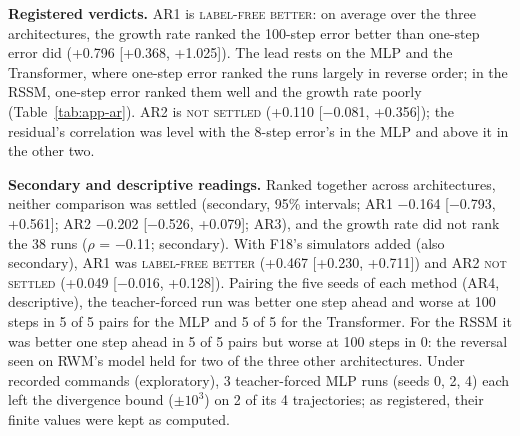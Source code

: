 \begin{table}[h]
\centering
\caption{Study AR: Spearman correlation $\rho$ of each check with the 100-step error $E_{100}$, recorded joint
commands, F18's held-out trajectories. Rows ``all runs'' and ``with F18'' (F18's 97 stored values added,
135 in all) rank every simulator together (secondary).}
\label{tab:app-ar}
\footnotesize
\setlength{\tabcolsep}{4pt}
\end{table}

\textbf{Registered verdicts.} AR1 is \textsc{label-free better}: on average over the three architectures, the growth
rate ranked the 100-step error better than one-step error did (+0.796 [+0.368, +1.025]). The lead rests on
the MLP and the Transformer, where one-step error ranked the runs largely in reverse order; in the RSSM, one-step error
ranked them well and the growth rate poorly (Table~\ref{tab:app-ar}). AR2 is \textsc{not settled}
(+0.110 [$-$0.081, +0.356]); the residual's correlation was level with the 8-step error's in the MLP and above it
in the other two.

\textbf{Secondary and descriptive readings.} Ranked together across architectures, neither comparison was settled
(secondary, 95\% intervals; AR1 $-$0.164 [$-$0.793, +0.561]; AR2 $-$0.202 [$-$0.526, +0.079];
AR3), and the growth rate did not rank the 38 runs ($\rho$ = $-$0.11; secondary). With F18's simulators added (also secondary), AR1 was
\textsc{label-free better} (+0.467 [+0.230, +0.711]) and AR2
\textsc{not settled} (+0.049 [$-$0.016, +0.128]). Pairing the five
seeds of each method (AR4, descriptive), the teacher-forced run was better one step ahead and worse at 100 steps in
5 of 5 pairs for the MLP and 5 of
5 for the Transformer. For the RSSM it was better one step ahead in
5 of 5 pairs but worse at 100 steps in 0:
the reversal seen on RWM's model held for two of the three other architectures. Under recorded commands (exploratory),
3 teacher-forced MLP runs (seeds 0, 2, 4) each left the divergence bound ($\pm10^3$) on 2 of
its 4 trajectories; as registered, their finite values were kept as computed.

